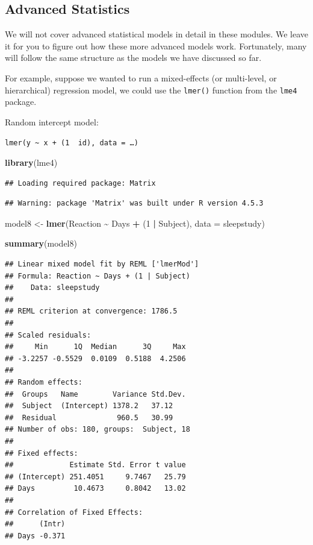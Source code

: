 \documentclass[
]{book}
\newenvironment{Shaded}{\begin{snugshade}}{\end{snugshade}}
\newcommand{\AttributeTok}[1]{\textcolor[rgb]{0.13,0.29,0.53}{#1}}
\newcommand{\DecValTok}[1]{\textcolor[rgb]{0.00,0.00,0.81}{#1}}
\newcommand{\FunctionTok}[1]{\textcolor[rgb]{0.13,0.29,0.53}{\textbf{#1}}}
\newcommand{\NormalTok}[1]{#1}
\newcommand{\OtherTok}[1]{\textcolor[rgb]{0.56,0.35,0.01}{#1}}
\newcommand{\SpecialCharTok}[1]{\textcolor[rgb]{0.81,0.36,0.00}{\textbf{#1}}}
\begin{document}
\subsection{Advanced Statistics}\label{advanced-statistics}

We will not cover advanced statistical models in detail in these modules. We leave it for you to figure out how these more advanced models work. Fortunately, many will follow the same structure as the models we have discussed so far.

For example, suppose we wanted to run a mixed-effects (or multi-level, or hierarchical) regression model, we could use the \texttt{lmer()} function from the \texttt{lme4} package.

Random intercept model:

\texttt{lmer(y\ \textasciitilde{}\ x\ +\ (1\ \textbar{}\ id),\ data\ =\ …)}

\begin{Shaded}
\begin{Highlighting}[]
\FunctionTok{library}\NormalTok{(lme4)}
\end{Highlighting}
\end{Shaded}

\begin{verbatim}
## Loading required package: Matrix
\end{verbatim}

\begin{verbatim}
## Warning: package 'Matrix' was built under R version 4.5.3
\end{verbatim}

\begin{Shaded}
\begin{Highlighting}[]
\NormalTok{model8 }\OtherTok{\textless{}{-}} \FunctionTok{lmer}\NormalTok{(Reaction }\SpecialCharTok{\textasciitilde{}}\NormalTok{ Days }\SpecialCharTok{+}\NormalTok{ (}\DecValTok{1} \SpecialCharTok{|}\NormalTok{ Subject), }\AttributeTok{data =}\NormalTok{ sleepstudy)}

\FunctionTok{summary}\NormalTok{(model8)}
\end{Highlighting}
\end{Shaded}

\begin{verbatim}
## Linear mixed model fit by REML ['lmerMod']
## Formula: Reaction ~ Days + (1 | Subject)
##    Data: sleepstudy
## 
## REML criterion at convergence: 1786.5
## 
## Scaled residuals: 
##     Min      1Q  Median      3Q     Max 
## -3.2257 -0.5529  0.0109  0.5188  4.2506 
## 
## Random effects:
##  Groups   Name        Variance Std.Dev.
##  Subject  (Intercept) 1378.2   37.12   
##  Residual              960.5   30.99   
## Number of obs: 180, groups:  Subject, 18
## 
## Fixed effects:
##             Estimate Std. Error t value
## (Intercept) 251.4051     9.7467   25.79
## Days         10.4673     0.8042   13.02
## 
## Correlation of Fixed Effects:
##      (Intr)
## Days -0.371
\end{verbatim}
\end{document}
